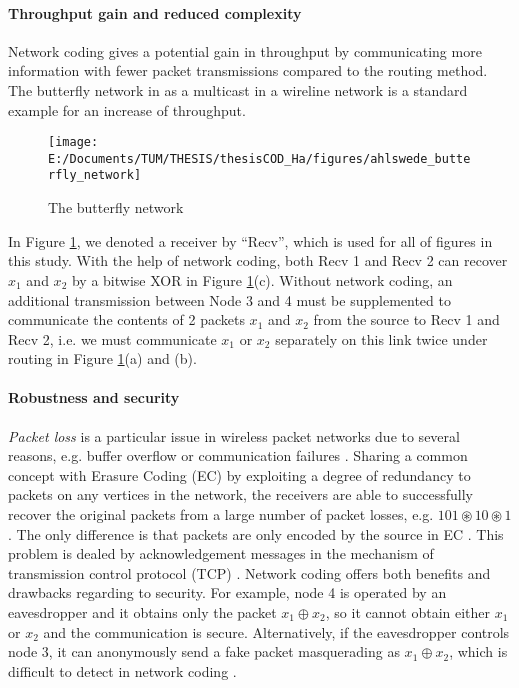 \paragraph{Throughput gain and reduced complexity}

Network coding gives a potential gain in throughput by communicating
more information with fewer packet transmissions compared to the routing
method. The butterfly network in \cite{Ahlswede:2000} as a multicast
in a wireline network is a standard example for an increase of throughput.

\begin{figure}[H]
\caption{The butterfly network \label{fig:The-butterfly-network}}

\centering{}\texttt{[image: E:/Documents/TUM/THESIS/thesisCOD\_Ha/figures/ahlswede\_butterfly\_network]}
\end{figure}

In Figure \ref{fig:The-butterfly-network}, we denoted a receiver
by ``Recv'', which is used for all of figures in this study. With
the help of network coding, both Recv 1 and Recv 2 can recover $x_{1}$
and $x_{2}$ by a bitwise XOR in Figure \ref{fig:The-butterfly-network}(c).
Without network coding, an additional transmission between Node 3
and 4 must be supplemented to communicate the contents of 2 packets
$x_{1}$ and $x_{2}$ from the source to Recv 1 and Recv 2, i.e. we
must communicate $x_{1}$ or $x_{2}$ separately on this link twice
under routing in Figure \ref{fig:The-butterfly-network}(a) and (b). 

\paragraph{Robustness and security}

\textit{Packet loss} is a particular issue in wireless packet networks
due to several reasons, e.g. buffer overflow or communication failures
\cite{Ho:2008}. Sharing a common concept with Erasure Coding (EC)
by exploiting a degree of redundancy to packets on any vertices in
the network, the receivers are able to successfully recover the original
packets from a large number of packet losses, e.g. $101\circledast10\circledast1$.
The only difference is that packets are only encoded by the source
in EC \cite{Fujimura:2008}. This problem is dealed by acknowledgement
messages in the mechanism of transmission control protocol (TCP) \cite{Ho:2008}.
Network coding offers both benefits and drawbacks regarding to security.
For example, node 4 is operated by an eavesdropper and it obtains
only the packet $x_{1}\oplus x_{2}$, so it cannot obtain either $x_{1}$
or $x_{2}$ and the communication is secure. Alternatively, if the
eavesdropper controls node 3, it can anonymously send a fake packet
masquerading as $x_{1}\oplus x_{2}$, which is difficult to detect
in network coding \cite{Ho:2008}.

